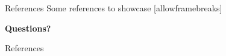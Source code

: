 \documentclass[10pt]{beamer}
\begin{document}
\begin{frame}{References}
	Some references to showcase [allowframebreaks] \cite{yang2023harnessing}
\end{frame}


{
\begin{frame}[standout]
	\textbf{Questions?}
\end{frame}
}

\begin{frame}[allowframebreaks]{References}

	
	

\end{frame}
\end{document}
